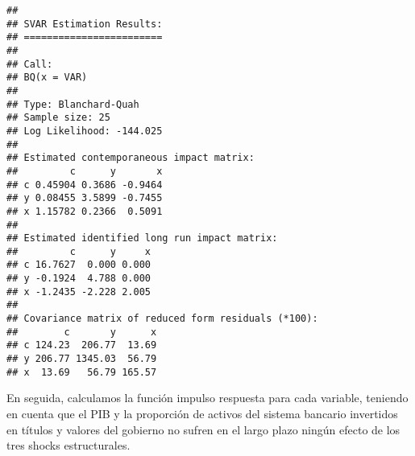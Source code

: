 \documentclass[
]{book}
\begin{document}
\begin{verbatim}
## 
## SVAR Estimation Results:
## ======================== 
## 
## Call:
## BQ(x = VAR)
## 
## Type: Blanchard-Quah 
## Sample size: 25 
## Log Likelihood: -144.025 
## 
## Estimated contemporaneous impact matrix:
##         c      y       x
## c 0.45904 0.3686 -0.9464
## y 0.08455 3.5899 -0.7455
## x 1.15782 0.2366  0.5091
## 
## Estimated identified long run impact matrix:
##         c      y     x
## c 16.7627  0.000 0.000
## y -0.1924  4.788 0.000
## x -1.2435 -2.228 2.005
## 
## Covariance matrix of reduced form residuals (*100):
##        c       y      x
## c 124.23  206.77  13.69
## y 206.77 1345.03  56.79
## x  13.69   56.79 165.57
\end{verbatim}

En seguida, calculamos la función impulso respuesta para cada variable, teniendo en cuenta que el PIB y la proporción de activos del sistema bancario invertidos en títulos y valores del gobierno no sufren en el largo plazo ningún efecto de los tres shocks estructurales.
\end{document}
